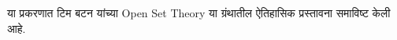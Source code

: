 \documentclass[../../../include/open-logic-chapter]{subfiles}
\begin{document}

\begin{editorial}
या प्रकरणात टिम बटन यांच्या Open Set Theory या ग्रंथातील ऐतिहासिक प्रस्तावना
समाविष्ट केली आहे.
\end{editorial}

\end{document}
